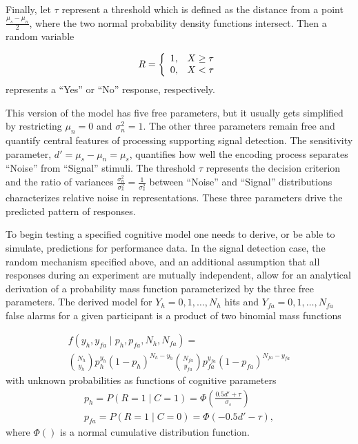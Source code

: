 \documentclass[12pt]{article}
\begin{document}
Finally, let $\tau$ represent a threshold which is defined as the distance from a point ${\frac{\mu_s - \mu_n}{2}}$,   where the two normal probability density functions intersect. Then a random variable 

\begin{equation}
R = \left\{
	\begin{array}{l l}
     1, & X \geq \tau\\
     0, & X < \tau
     \end{array}\right.
\end{equation}
represents a “Yes” or “No” response, respectively. 

	This version of the model has five free parameters, but it usually gets simplified by restricting $\mu_n = 0$ and $\sigma_n^2 = 1$. The other three parameters remain free and quantify central features of processing supporting signal detection. The sensitivity parameter, $d' = \mu_s - \mu_n = \mu_s$, quantifies how well the encoding process separates “Noise” from “Signal” stimuli. The threshold $\tau$ represents the decision criterion and the ratio of variances $\frac{\sigma_n^2}{\sigma_s^2} = \frac{1}{\sigma_s^2}$ between “Noise” and “Signal” distributions characterizes relative noise in representations. These three parameters drive the predicted pattern of responses. 
    
	To begin testing a specified cognitive model one needs to derive, or be able to simulate, predictions for performance data. In the signal detection case, the random mechanism specified above, and an additional assumption that all responses during an experiment are mutually independent, allow for an analytical derivation of a probability mass function parameterized by the three free parameters.  The derived model for $Y_h = 0, 1, \ldots, N_h$ hits and $Y_{fa} = 0, 1, \ldots, N_{fa}$  false alarms for a given participant is a product of two binomial mass functions    
    
\begin{gather}
f(y_h, y_{fa} \mid p_h, p_{fa}, N_h, N_{fa}) = \nonumber \\
\binom{N_h}{y_h}p_h^{y_h}(1 - p_{h})^{N_h - y_h}
\binom{N_{fa}}{y_{fa}}p_{fa}^{y_{fa}}(1 - p_{fa})^{N_{fa} - y_{fa}}
\end{gather}
with unknown probabilities as functions of cognitive parameters
\begin{align}\nonumber
p_h = P(R = 1 \mid C = 1) = \Phi(\frac{0.5d' + \tau}{\sigma_s}) \nonumber \\
p_{fa} = P(R = 1 \mid C = 0) = \Phi(-0.5d' - \tau),
\end{align}
where $\Phi( )$ is a normal cumulative distribution function.
    
\end{document}
